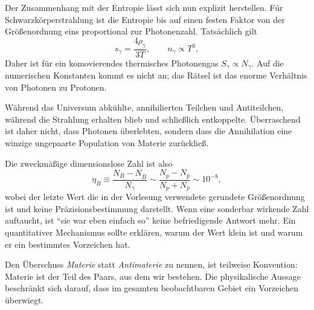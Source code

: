 Der Zusammenhang mit der Entropie lässt sich nun explizit herstellen. Für Schwarzkörperstrahlung ist die Entropie bis auf einen festen Faktor von der Größenordnung eins proportional zur Photonenzahl. Tatsächlich gilt
\begin{equation}
s_\gamma=\frac{4\rho_\gamma}{3T},
\qquad
n_\gamma\propto T^3,
\end{equation}
Daher ist für ein komovierendes thermisches Photonengas \(S_\gamma\propto N_\gamma\). Auf die numerischen Konstanten kommt es nicht an; das Rätsel ist das enorme Verhältnis von Photonen zu Protonen.

\begin{classroomqa}\end{classroomqa}

Während das Universum abkühlte, annihilierten Teilchen und Antiteilchen, während die Strahlung erhalten blieb und schließlich entkoppelte. Überraschend ist daher nicht, dass Photonen überlebten, sondern dass die Annihilation eine winzige ungepaarte Population von Materie zurückließ.

Die zweckmäßige dimensionslose Zahl ist also
\begin{equation}
\eta_B
\equiv
\frac{N_B-N_{\bar B}}{N_\gamma}
\sim
\frac{N_p-N_{\bar p}}{N_p+N_{\bar p}}
\sim 10^{-8},
\label{eq:c08-baryon-asymmetry}
\end{equation}
wobei der letzte Wert die in der Vorlesung verwendete gerundete Größenordnung ist und keine Präzisionsbestimmung darstellt. Wenn eine sonderbar wirkende Zahl auftaucht, ist ``sie war eben einfach so'' keine befriedigende Antwort mehr. Ein quantitativer Mechanismus sollte erklären, warum der Wert klein ist und warum er ein bestimmtes Vorzeichen hat.

Den Überschuss \emph{Materie} statt \emph{Antimaterie} zu nennen, ist teilweise Konvention: Materie ist der Teil des Paars, aus dem wir bestehen. Die physikalische Aussage beschränkt sich darauf, dass im gesamten beobachtbaren Gebiet ein Vorzeichen überwiegt.

